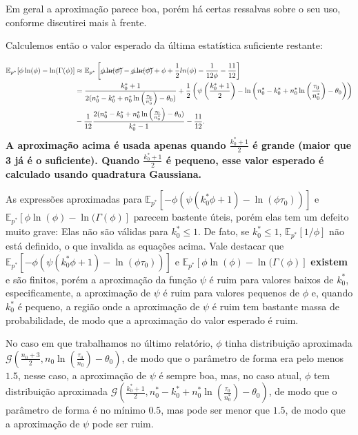 \documentclass[
]{article}
\begin{document}
Em geral a aproximação parece boa, porém há certas ressalvas sobre o seu
uso, conforme discutirei mais à frente.

Calculemos então o valor esperado da última estatística suficiente
restante:

\[
\begin{aligned}
\mathbb{E}_{p^*}[\phi\ln(\phi)-\ln(\Gamma(\phi)]&\approx\mathbb{E}_{p^*}\left[\cancel{\phi\ln(\phi)}-\cancel{\phi\ln(\phi)}+\phi+\frac{1}{2}ln(\phi)-\frac{1}{12\phi}-\frac{11}{12}\right]\\
&=\frac{k^*_0+1}{2(n_0^*-k_0^*+n_0^*\ln\left(\frac{\tau_0}{n^*_0}\right)-\theta_0)}+\frac{1}{2}\left(\psi\left(\frac{k^*_0+1}{2}\right)-\ln\left(n_0^*-k_0^*+n_0^*\ln\left(\frac{\tau_0}{n^*_0}\right)-\theta_0\right)\right)\\
&-\frac{1}{12}\frac{2(n_0^*-k_0^*+n_0^*\ln\left(\frac{\tau_0}{n^*_0}\right)-\theta_0)}{k^*_0-1}-\frac{11}{12}.
\end{aligned}
\] \textbf{A aproximação acima é usada apenas quando
\(\frac{k_0^*+1}{2}\) é grande (maior que 3 já é o suficiente). Quando
\(\frac{k_0^*+1}{2}\) é pequeno, esse valor esperado é calculado usando
quadratura Gaussiana.}

As expressões aproximadas para
\(\mathbb{E}_{p^*}[-\phi(\psi(k^*_0\phi+1)-\ln(\phi\tau_0))]\) e
\(\mathbb{E}_{p^*}[\phi\ln(\phi)-\ln(\Gamma(\phi)]\) parecem bastente
úteis, porém elas tem um defeito muito grave: Elas não são válidas para
\(k_0^*\le1\). De fato, se \(k_0^*\le1\), \(\mathbb{E}_{p^*}[1/\phi]\)
não está definido, o que invalida as equações acima. Vale destacar que
\(\mathbb{E}_{p^*}[-\phi(\psi(k^*_0\phi+1)-\ln(\phi\tau_0))]\) e
\(\mathbb{E}_{p^*}[\phi\ln(\phi)-\ln(\Gamma(\phi)]\) \textbf{existem} e
são finitos, porém a aproximação da função \(\psi\) é ruim para valores
baixos de \(k_0^*\), especificamente, a aproximação de \(\psi\) é ruim
para valores pequenos de \(\phi\) e, quando \(k_0^*\) é pequeno, a
região onde a aproximação de \(\psi\) é ruim tem bastante massa de
probabilidade, de modo que a aproximação do valor esperado é ruim.

No caso em que trabalhamos no último relatório, \(\phi\) tinha
distribuição aproximada
\(\mathcal{G}\left(\frac{n_0+3}{2},n_0\ln\left(\frac{\tau_0}{n_0}\right)-\theta_0\right)\),
de modo que o parâmetro de forma era pelo menos \(1.5\), nesse caso, a
aproximação de \(\psi\) é sempre boa, mas, no caso atual, \(\phi\) tem
distribuição aproximada
\(\mathcal{G}\left(\frac{k^*_0+1}{2},n_0^*-k_0^*+n_0^*\ln\left(\frac{\tau_0}{n^*_0}\right)-\theta_0\right)\),
de modo que o parâmetro de forma é no mínimo \(0.5\), mas pode ser menor
que \(1.5\), de modo que a aproximação de \(\psi\) pode ser ruim.
\end{document}
